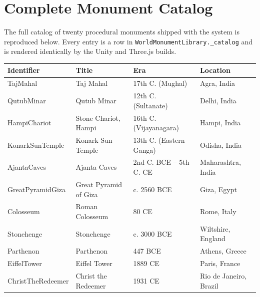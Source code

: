 \appendix

\chapter{Complete Monument Catalog}

The full catalog of twenty procedural monuments shipped with the system is reproduced below. Every entry is a row in \texttt{WorldMonumentLibrary.\_catalog} and is rendered identically by the Unity and Three.js builds.

\begin{table}[h!]
\centering
\renewcommand{\arraystretch}{1.3}
\setlength{\tabcolsep}{4pt}
\footnotesize
\begin{tabular}{|p{3.4cm}|p{3.6cm}|p{3.0cm}|p{3.4cm}|}
\hline
\textbf{Identifier} & \textbf{Title} & \textbf{Era} & \textbf{Location} \\
\hline
TajMahal           & Taj Mahal                      & 17th C. (Mughal)         & Agra, India \\\hline
QutubMinar         & Qutub Minar                    & 12th C. (Sultanate)      & Delhi, India \\\hline
HampiChariot       & Stone Chariot, Hampi           & 16th C. (Vijayanagara)   & Hampi, India \\\hline
KonarkSunTemple    & Konark Sun Temple              & 13th C. (Eastern Ganga)  & Odisha, India \\\hline
AjantaCaves        & Ajanta Caves                   & 2nd C. BCE -- 5th C. CE  & Maharashtra, India \\\hline
GreatPyramidGiza   & Great Pyramid of Giza          & c. 2560 BCE              & Giza, Egypt \\\hline
Colosseum          & Roman Colosseum                & 80 CE                    & Rome, Italy \\\hline
Stonehenge         & Stonehenge                     & c. 3000 BCE              & Wiltshire, England \\\hline
Parthenon          & Parthenon                      & 447 BCE                  & Athens, Greece \\\hline
EiffelTower        & Eiffel Tower                   & 1889 CE                  & Paris, France \\\hline
ChristTheRedeemer  & Christ the Redeemer            & 1931 CE                  & Rio de Janeiro, Brazil \\\hline

\end{tabular}
\end{table}
